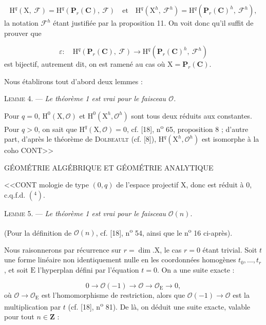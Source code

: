 \begin{equation*}
\mathrm{H}^q(\mathrm{X},\ \mathcal{F}) = \mathrm{H}^q(\mathbf{P}_r(\mathbf{C}),\ \mathcal{F}) \quad \mathrm{et} \quad \mathrm{H}^q(\mathrm{X}^h,\ \mathcal{F}^h) = \mathrm{H}^q(\mathbf{P}_r(\mathbf{C})^h,\ \mathcal{F}^h),
\end{equation*}
la notation $\mathcal{F}^h$ étant justifiée par la proposition 11. On voit donc qu'il suffit de prouver que

\begin{equation*}
\varepsilon : \quad \mathrm{H}^q(\mathbf{P}_r(\mathbf{C}),\ \mathcal{F}) \longrightarrow \mathrm{H}^q(\mathbf{P}_r(\mathbf{C})^h,\ \mathcal{F}^h)
\end{equation*}
est bijectif, autrement dit, on est ramené au cas où $\mathrm{X} = \mathbf{P}_r(\mathbf{C})$.

Nous établirons tout d'abord deux lemmes :

\textsc{Lemme} 4. --- \textit{Le théorème 1 est vrai pour le faisceau $\mathcal{O}$.}

Pour $q = 0$, $\mathrm{H}^0(\mathrm{X}, \mathcal{O})$ et $\mathrm{H}^0(\mathrm{X}^h, \mathcal{O}^h)$ sont tous deux réduits aux constantes. Pour $q > 0$, on sait que $\mathrm{H}^q(\mathrm{X}, \mathcal{O}) = 0$, cf. [18], n\textsuperscript{o} 65, proposition 8 ; d'autre part, d'après le théorème de \textsc{Dolbeault} (cf. [8]), $\mathrm{H}^q(\mathrm{X}^h, \mathcal{O}^h)$ est isomorphe à la coho CONT>>




GÉOMÉTRIE ALGÉBRIQUE ET GÉOMÉTRIE ANALYTIQUE

<<CONT mologie de type $(0, q)$ de l'espace projectif $\mathrm{X}$, donc est réduit à $0$, c.q.f.d. $(^4)$.

\textsc{Lemme} 5. — \textit{Le théorème 1 est vrai pour le faisceau} $\mathcal{O}(n)$.

(Pour la définition de $\mathcal{O}(n)$, cf. [18], n\textsuperscript{o} 54, ainsi que le n\textsuperscript{o} 16 ci-après).

Nous raisonnerons par récurrence sur $r = \dim. \mathrm{X}$, le cas $r = 0$ étant trivial. Soit $t$ une forme linéaire non identiquement nulle en les coordonnées homogènes $t_0, \ldots, t_r$, et soit $\mathrm{E}$ l'hyperplan défini par l'équation $t = 0$. On a une suite exacte :

\begin{equation*}
0 \rightarrow \mathcal{O}(-1) \rightarrow \mathcal{O} \rightarrow \mathcal{O}_{\mathrm{E}} \rightarrow 0,
\end{equation*}
où $\mathcal{O} \rightarrow \mathcal{O}_{\mathrm{E}}$ est l'homomorphisme de restriction, alors que $\mathcal{O}(-1) \rightarrow \mathcal{O}$ est la multiplication par $t$ (cf. [18], n\textsuperscript{o} 81). De là, on déduit une suite exacte, valable pour tout $n \in \mathbf{Z}$ :

